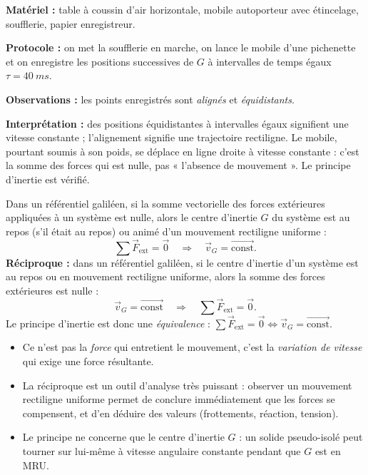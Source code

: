 \documentclass[11pt]{article}
\begin{document}
\begin{experience}
\textbf{Matériel :} table à coussin d'air horizontale, mobile autoporteur avec étincelage, soufflerie, papier enregistreur.\par
\textbf{Protocole :} on met la soufflerie en marche, on lance le mobile d'une pichenette et on enregistre les positions successives de $G$ à intervalles de temps égaux $\tau = \SI{40}{ms}$.\par
\textbf{Observations :} les points enregistrés sont \emph{alignés} et \emph{équidistants}.\par
\textbf{Interprétation :} des positions équidistantes à intervalles égaux signifient une vitesse constante ; l'alignement signifie une trajectoire rectiligne. Le mobile, pourtant soumis à son poids, se déplace en ligne droite à vitesse constante : c'est la somme des forces qui est nulle, pas « l'absence de mouvement ». Le principe d'inertie est vérifié.
\end{experience}

\begin{propriete}
Dans un référentiel galiléen, si la somme vectorielle des forces extérieures appliquées à un système est nulle, alors le centre d'inertie $G$ du système est au repos (s'il était au repos) ou animé d'un mouvement rectiligne uniforme :
\[
\sum \vec{F}_{\text{ext}} = \vec{0} \quad \Longrightarrow \quad \vec{v}_G = \overrightarrow{\text{const}}.
\]
\textbf{Réciproque :} dans un référentiel galiléen, si le centre d'inertie d'un système est au repos ou en mouvement rectiligne uniforme, alors la somme des forces extérieures est nulle :
\[
\vec{v}_G = \overrightarrow{\text{const}} \quad \Longrightarrow \quad \sum \vec{F}_{\text{ext}} = \vec{0}.
\]
Le principe d'inertie est donc une \emph{équivalence} : $\sum \vec{F}_{\text{ext}} = \vec{0} \iff \vec{v}_G = \overrightarrow{\text{const}}$.
\end{propriete}

\begin{aretenir}
\begin{itemize}
\item Ce n'est pas la \emph{force} qui entretient le mouvement, c'est la \emph{variation de vitesse} qui exige une force résultante.
\item La réciproque est un outil d'analyse très puissant : observer un mouvement rectiligne uniforme permet de conclure immédiatement que les forces se compensent, et d'en déduire des valeurs (frottements, réaction, tension).
\item Le principe ne concerne que le centre d'inertie $G$ : un solide pseudo-isolé peut tourner sur lui-même à vitesse angulaire constante pendant que $G$ est en MRU.
\end{itemize}
\end{aretenir}
\end{document}
